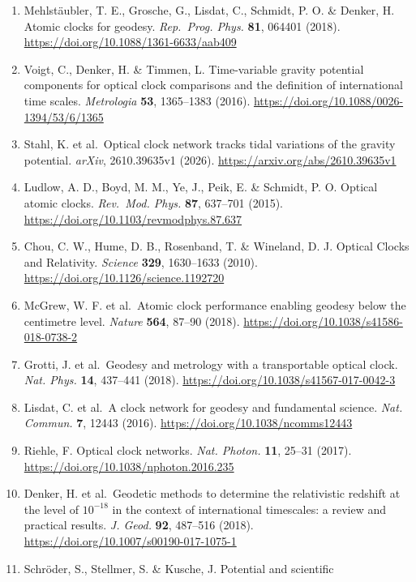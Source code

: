 \documentclass[
  10pt,
  a4paper,
]{article}
\providecommand{\tightlist}{%
  \setlength{\itemsep}{0pt}\setlength{\parskip}{0pt}}
\begin{document}
\begin{enumerate}
\def\labelenumi{\arabic{enumi}.}
\tightlist
\item
  Mehlstäubler, T. E., Grosche, G., Lisdat, C., Schmidt, P. O. \&
  Denker, H. Atomic clocks for geodesy. \emph{Rep.~Prog. Phys.}
  \textbf{81}, 064401 (2018).
  \url{https://doi.org/10.1088/1361-6633/aab409}
\item
  Voigt, C., Denker, H. \& Timmen, L. Time-variable gravity potential
  components for optical clock comparisons and the definition of
  international time scales. \emph{Metrologia} \textbf{53}, 1365--1383
  (2016). \url{https://doi.org/10.1088/0026-1394/53/6/1365}
\item
  Stahl, K. et al.~Optical clock network tracks tidal variations of the
  gravity potential. \emph{arXiv}, 2610.39635v1 (2026).
  \url{https://arxiv.org/abs/2610.39635v1}
\item
  Ludlow, A. D., Boyd, M. M., Ye, J., Peik, E. \& Schmidt, P. O. Optical
  atomic clocks. \emph{Rev.~Mod. Phys.} \textbf{87}, 637--701 (2015).
  \url{https://doi.org/10.1103/revmodphys.87.637}
\item
  Chou, C. W., Hume, D. B., Rosenband, T. \& Wineland, D. J. Optical
  Clocks and Relativity. \emph{Science} \textbf{329}, 1630--1633 (2010).
  \url{https://doi.org/10.1126/science.1192720}
\item
  McGrew, W. F. et al.~Atomic clock performance enabling geodesy below
  the centimetre level. \emph{Nature} \textbf{564}, 87--90 (2018).
  \url{https://doi.org/10.1038/s41586-018-0738-2}
\item
  Grotti, J. et al.~Geodesy and metrology with a transportable optical
  clock. \emph{Nat. Phys.} \textbf{14}, 437--441 (2018).
  \url{https://doi.org/10.1038/s41567-017-0042-3}
\item
  Lisdat, C. et al.~A clock network for geodesy and fundamental science.
  \emph{Nat. Commun.} \textbf{7}, 12443 (2016).
  \url{https://doi.org/10.1038/ncomms12443}
\item
  Riehle, F. Optical clock networks. \emph{Nat. Photon.} \textbf{11},
  25--31 (2017). \url{https://doi.org/10.1038/nphoton.2016.235}
\item
  Denker, H. et al.~Geodetic methods to determine the relativistic
  redshift at the level of \(10^{-18}\) in the context of international
  timescales: a review and practical results. \emph{J. Geod.}
  \textbf{92}, 487--516 (2018).
  \url{https://doi.org/10.1007/s00190-017-1075-1}
\item
  Schröder, S., Stellmer, S. \& Kusche, J. Potential and scientific

\end{enumerate}
\end{document}
